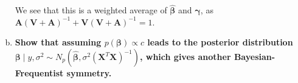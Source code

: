 \begin{enumerate}[a)]
We see that this is a weighted average of $\hat{\bm{\beta}}$ and $\bm{\gamma}$, as $\bm{A}(\bm{V} + \bm{A})^{-1} + \bm{V}(\bm{V} + \bm{A})^{-1} = 1$. 

\item \textbf{Show that assuming $p(\bm{\beta}) \propto c$ leads to the posterior distribution $\bm{\beta} \mid y, \sigma^2 \sim N_p(\hat{\bm{\beta}}, \sigma^2(\bm{X}^T\bm{X})^{-1})$, which
gives another Bayesian-Frequentist symmetry.}
\end{enumerate}
